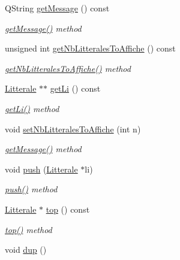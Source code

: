 \begin{DoxyCompactItemize}
\item 
Q\+String \hyperlink{class_pile_ab04b223738a2fa12b627b138a9c102ed}{get\+Message} () const 
\begin{DoxyCompactList}\small\item\em \hyperlink{class_pile_ab04b223738a2fa12b627b138a9c102ed}{get\+Message()} method \end{DoxyCompactList}\item 
unsigned int \hyperlink{class_pile_acd055c6426813bac9a127c1477c739af}{get\+Nb\+Litterales\+To\+Affiche} () const 
\begin{DoxyCompactList}\small\item\em \hyperlink{class_pile_acd055c6426813bac9a127c1477c739af}{get\+Nb\+Litterales\+To\+Affiche()} method \end{DoxyCompactList}\item 
\hyperlink{class_litterale}{Litterale} $\ast$$\ast$ \hyperlink{class_pile_a6123bd7fb1405c98bf91f3b094a67c2f}{get\+Li} () const 
\begin{DoxyCompactList}\small\item\em \hyperlink{class_pile_a6123bd7fb1405c98bf91f3b094a67c2f}{get\+Li()} method \end{DoxyCompactList}\item 
void \hyperlink{class_pile_a0092075cec9c06331a86c4c9dc12ebca}{set\+Nb\+Litterales\+To\+Affiche} (int n)
\begin{DoxyCompactList}\small\item\em \hyperlink{class_pile_ab04b223738a2fa12b627b138a9c102ed}{get\+Message()} method \end{DoxyCompactList}\item 
void \hyperlink{class_pile_abf3bd33dc3b024dabeda45f020256637}{push} (\hyperlink{class_litterale}{Litterale} $\ast$li)
\begin{DoxyCompactList}\small\item\em \hyperlink{class_pile_abf3bd33dc3b024dabeda45f020256637}{push()} method \end{DoxyCompactList}\item 
\hyperlink{class_litterale}{Litterale} $\ast$ \hyperlink{class_pile_a2321894a738fbfe3a7ffcf55507f567b}{top} () const 
\begin{DoxyCompactList}\small\item\em \hyperlink{class_pile_a2321894a738fbfe3a7ffcf55507f567b}{top()} method \end{DoxyCompactList}\item 
void \hyperlink{class_pile_a081f7843d01cae1f0f7be7d92e46d5d2}{dup} ()
$$
\end{DoxyCompactItemize}
